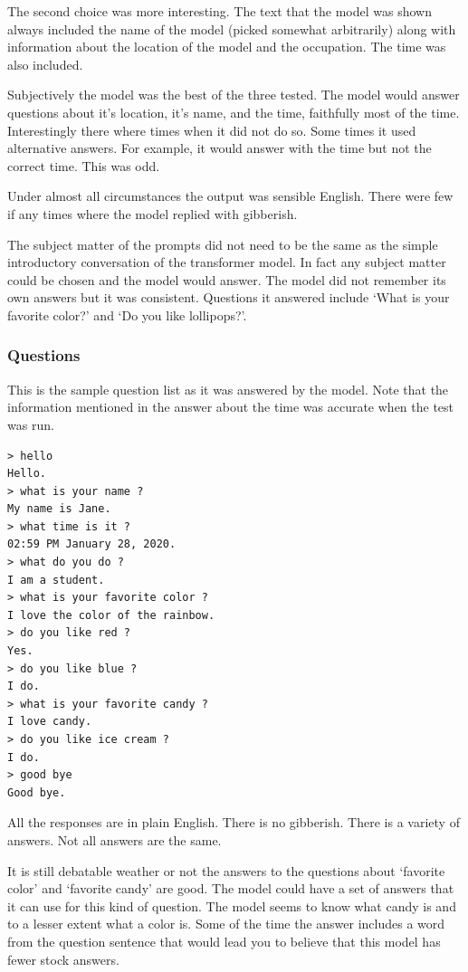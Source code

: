 The second choice was more interesting. The text that the model was shown always included the name of the model (picked somewhat arbitrarily) along with information about the location of the model and the occupation. The time was also included.

Subjectively the model was the best of the three tested. The model would answer questions about it's location, it's name, and the time, faithfully most of the time. Interestingly there where times when it did not do so. Some times it used alternative answers. For example, it would answer with the time but not the correct time. This was odd.

Under almost all circumstances the output was sensible English. There were few if any times where the model replied with gibberish. 

The subject matter of the prompts did not need to be the same as the simple introductory conversation of the transformer model. In fact any subject matter could be chosen and the model would answer. The model did not remember its own answers but it was consistent. Questions it answered include `What is your favorite color?' and `Do you like lollipops?'. 

\subsubsection*{Questions}
This is the sample question list as it was answered by the model. Note that the information mentioned in the answer about the time was accurate when the test was run.

\begin{verbatim}
> hello
Hello.
> what is your name ?
My name is Jane.
> what time is it ?
02:59 PM January 28, 2020.
> what do you do ?
I am a student.
> what is your favorite color ?
I love the color of the rainbow.
> do you like red ?
Yes.
> do you like blue ?
I do.
> what is your favorite candy ?
I love candy.
> do you like ice cream ?
I do. 
> good bye
Good bye.
\end{verbatim}

All the responses are in plain English. There is no gibberish. There is a variety of answers. Not all answers are the same. 

It is still debatable weather or not the answers to the questions about `favorite color' and `favorite candy' are good. The model could have a set of answers that it can use for this kind of question. The model seems to know what candy is and to a lesser extent what a color is. Some of the time the answer includes a word from the question sentence that would lead you to believe that this model has fewer stock answers.

